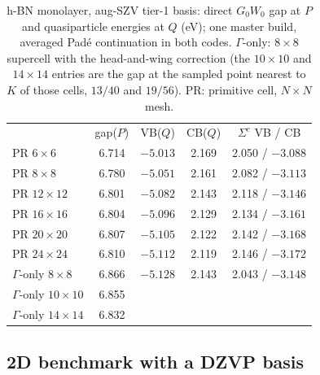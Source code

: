 \documentclass[%
 reprint,
superscriptaddress,
 amsmath,amssymb,
 aps,
prb,
]{revtex4-2}
\begin{document}
\begin{table}[h]
\caption{h-BN monolayer, aug-SZV tier-1 basis: direct $G_0W_0$ gap at $P$ and quasiparticle
energies at $Q$ (eV); one master build, averaged Pad\'e continuation in both codes.
$\Gamma$-only: $8\times8$ supercell with the head-and-wing correction (the $10\times10$ and
$14\times14$ entries are the gap at the sampled point nearest to $K$ of those cells, $13/40$
and $19/56$). PR: primitive cell, $N\times N$ mesh.}
\label{tab:resval}
\begin{ruledtabular}
\begin{tabular}{lcccc}
 & gap($P$) & VB($Q$) & CB($Q$) & $\Sigma^c$ VB / CB\\
\colrule
PR $6\times6$   & 6.714 & $-5.013$ & 2.169 & 2.050 / $-3.088$\\
PR $8\times8$   & 6.780 & $-5.051$ & 2.161 & 2.082 / $-3.113$\\
PR $12\times12$ & 6.801 & $-5.082$ & 2.143 & 2.118 / $-3.146$\\
PR $16\times16$ & 6.804 & $-5.096$ & 2.129 & 2.134 / $-3.161$\\
PR $20\times20$ & 6.807 & $-5.105$ & 2.122 & 2.142 / $-3.168$\\
PR $24\times24$ & 6.810 & $-5.112$ & 2.119 & 2.146 / $-3.172$\\
$\Gamma$-only $8\times8$ & 6.866 & $-5.128$ & 2.143 & 2.043 / $-3.148$\\
$\Gamma$-only $10\times10$ & 6.855 & & & \\
$\Gamma$-only $14\times14$ & 6.832 & & & \\
\end{tabular}
\end{ruledtabular}
\end{table}

\subsection{2D benchmark with a DZVP basis}
\label{sec:res2d}
\end{document}
